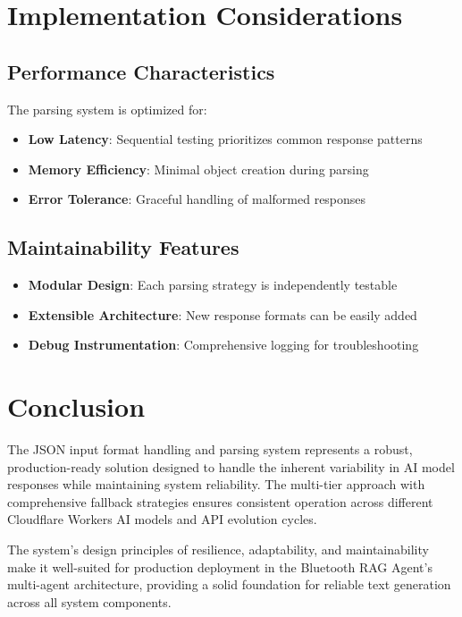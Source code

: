 \documentclass[11pt,a4paper]{article}
\begin{document}
\section{Implementation Considerations}

\subsection{Performance Characteristics}

The parsing system is optimized for:
\begin{itemize}
    \item \textbf{Low Latency}: Sequential testing prioritizes common response patterns
    \item \textbf{Memory Efficiency}: Minimal object creation during parsing
    \item \textbf{Error Tolerance}: Graceful handling of malformed responses
\end{itemize}

\subsection{Maintainability Features}

\begin{itemize}
    \item \textbf{Modular Design}: Each parsing strategy is independently testable
    \item \textbf{Extensible Architecture}: New response formats can be easily added
    \item \textbf{Debug Instrumentation}: Comprehensive logging for troubleshooting
\end{itemize}

\section{Conclusion}

The JSON input format handling and parsing system represents a robust, production-ready solution designed to handle the inherent variability in AI model responses while maintaining system reliability. The multi-tier approach with comprehensive fallback strategies ensures consistent operation across different Cloudflare Workers AI models and API evolution cycles.

The system's design principles of resilience, adaptability, and maintainability make it well-suited for production deployment in the Bluetooth RAG Agent's multi-agent architecture, providing a solid foundation for reliable text generation across all system components.
\end{document}
